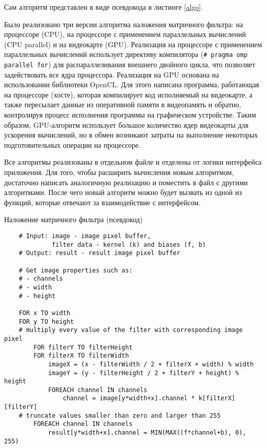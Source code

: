 Сам алгоритм представлен в виде псевдокода в листинге \ref{algo}.

Было реализовано три версии алгоритма наложения матричного фильтра: на процессоре (CPU), на процессоре с применением параллельных 
вычислений (CPU parallel) и на видеокарте (GPU). Реализация на процессоре с применением параллельных вычислений использует директиву 
компилятора (\verb!# pragma omp parallel for!) для распараллеливания внешнего двойного цикла, что позволяет задействовать все ядра процессора. 
Реализация на GPU основана на использовании библиотеки OpenCL. Для этого написана программа, работающая на процессоре (хосте), 
которая компилирует код исполняемый на видеокарте, а также пересылает данные из оперативной памяти в видеопамять и обратно, контролируя 
процесс исполнения программы на графическом устройстве. Таким образом, GPU-алгоритм использует большое количество ядер видеокарты для 
ускорения вычислений, но в обмен возникают затраты на выполнение некоторых подготовительных операции на процессоре.

Все алгоритмы реализованы в отдельном файле и отделены от логики интерфейса приложения. Для того, чтобы расширить вычисления новым 
алгоритмом, достаточно написать аналогичную реализацию и поместить в файл с другими алгоритмами. После чего новый алгоритм можно будет 
вызвать из одной из функций, которые отвечают за взаимодействие с интерфейсом.


\begin{minipage}{0.95\textwidth}
\begin{algorithm}[H]
    \centering
    \caption{Наложение матричного фильтра (псевдокод)}\label{algo}
    \begin{verbatim}
    # Input: image - image pixel buffer,
             filter data - kernel (k) and biases (f, b)
    # Output: result - result image pixel buffer
    
    # Get image properties such as:
    # - channels
    # - width
    # - height
    
    FOR x TO width
    FOR y TO height
    # multiply every value of the filter with corresponding image pixel
        FOR filterY TO filterHeight
        FOR filterX TO filterWidth
            imageX = (x - filterWidth / 2 + filterX + width) % width
            imageY = (y - filterHeight / 2 + filterY + height) % height
            FOREACH channel IN channels
                channel = image[y*width+x].channel * k[filterX][filterY]
    # truncate values smaller than zero and larger than 255
        FOREACH channel IN channels
            result[y*width+x].channel = MIN(MAX((f*channel+b), 0), 255)
    \end{verbatim}
\end{algorithm}
\end{minipage}\hfill

\pagebreak